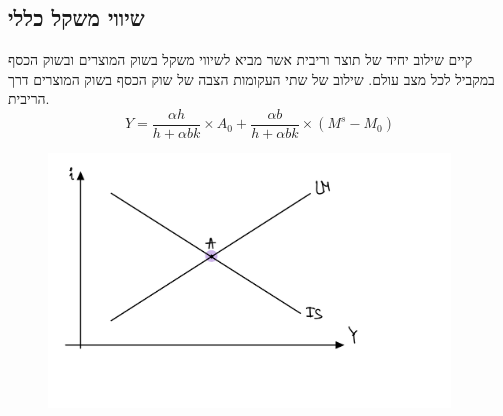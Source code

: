 \documentclass[a4paper,11pt]{article}
\begin{document}
\begin{RTL}
\section{שיווי משקל כללי}
קיים שילוב יחיד של תוצר וריבית אשר מביא לשיווי משקל בשוק המוצרים ובשוק הכסף במקביל לכל מצב
עולם.
שילוב של שתי העקומות הצבה של שוק הכסף בשוק המוצרים דרך הריבית.
\begin{equation*}
    Y=\frac{\alpha h}{h+\alpha b k} \times A_0+\frac{\alpha b}{h+\alpha b k} \times\left(M^s-M_0\right)
\end{equation*}

\begin{figure}[H]
        \begin{center}
            \includegraphics[width=0.95\textwidth]{figures/ISLM default.png}
        \end{center}
        \label{fig:}
\end{figure}


\end{RTL}
\end{document}

